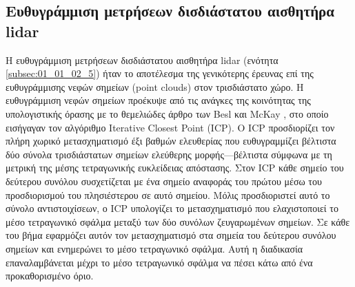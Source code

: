 \subsection{Ευθυγράμμιση μετρήσεων δισδιάστατου αισθητήρα lidar}
\label{subsection:02_02_02:1}

Η ευθυγράμμιση μετρήσεων δισδιάστατου αισθητήρα lidar (ενότητα
\ref{subsec:01_01_02_5}) ήταν το αποτέλεσμα της γενικότερης έρευνας επί της
ευθυγράμμισης νεφών σημείων (point clouds) στον τρισδιάστατο χώρο. Η
ευθυγράμμιση νεφών σημείων προέκυψε από τις ανάγκες της κοινότητας της
υπολογιστικής όρασης με το θεμελιώδες άρθρο των Besl και McKay
\cite{Besl1992c}, στο οποίο εισήγαγαν τον αλγόριθμο Iterative Closest Point
(ICP). Ο ICP προσδιορίζει τον πλήρη χωρικό μετασχηματισμό έξι βαθμών ελευθερίας
που ευθυγραμμίζει βέλτιστα δύο σύνολα τρισδιάστατων σημείων ελεύθερης
μορφής---βέλτιστα σύμφωνα με τη μετρική της μέσης τετραγωνικής ευκλείδειας
απόστασης. Στον ICP κάθε σημείο του δεύτερου συνόλου συσχετίζεται με ένα σημείο
αναφοράς του πρώτου μέσω του προσδιορισμού του πλησιέστερου σε αυτό
σημείου. Μόλις προσδιοριστεί αυτό το σύνολο αντιστοιχίσεων, ο ICP υπολογίζει το
μετασχηματισμό που ελαχιστοποιεί το μέσο τετραγωνικό σφάλμα μεταξύ των δύο
συνόλων ζευγαρωμένων σημείων. Σε κάθε του βήμα εφαρμόζει αυτόν τον
μετασχηματισμό στα σημεία του δεύτερου συνόλου σημείων και ενημερώνει το μέσο
τετραγωνικό σφάλμα. Αυτή η διαδικασία επαναλαμβάνεται μέχρι το μέσο τετραγωνικό
σφάλμα να πέσει κάτω από ένα προκαθορισμένο όριο.

